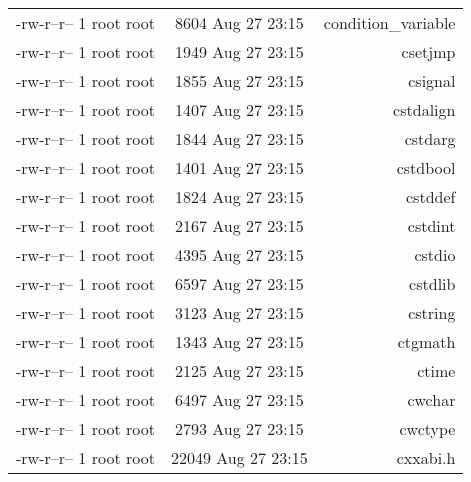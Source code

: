 \documentclass[10pt]{article}
\begin{document}
\begin{tabular}{|l|c|r|}
    -rw-r--r-- 1 root root &  8604 Aug 27 23:15 & condition\_variable\\
    -rw-r--r-- 1 root root &  1949 Aug 27 23:15 & csetjmp\\
    -rw-r--r-- 1 root root &  1855 Aug 27 23:15 & csignal\\
    -rw-r--r-- 1 root root &  1407 Aug 27 23:15 & cstdalign\\
    -rw-r--r-- 1 root root &  1844 Aug 27 23:15 & cstdarg\\
    -rw-r--r-- 1 root root &  1401 Aug 27 23:15 & cstdbool\\
    -rw-r--r-- 1 root root &  1824 Aug 27 23:15 & cstddef\\
    -rw-r--r-- 1 root root &  2167 Aug 27 23:15 & cstdint\\
    -rw-r--r-- 1 root root &  4395 Aug 27 23:15 & cstdio\\
    -rw-r--r-- 1 root root &  6597 Aug 27 23:15 & cstdlib\\
    -rw-r--r-- 1 root root &  3123 Aug 27 23:15 & cstring\\
    -rw-r--r-- 1 root root &  1343 Aug 27 23:15 & ctgmath\\
    -rw-r--r-- 1 root root &  2125 Aug 27 23:15 & ctime\\
    -rw-r--r-- 1 root root &  6497 Aug 27 23:15 & cwchar\\
    -rw-r--r-- 1 root root &  2793 Aug 27 23:15 & cwctype\\
    -rw-r--r-- 1 root root & 22049 Aug 27 23:15 & cxxabi.h\\
    \end{tabular}
     
\end{document}
